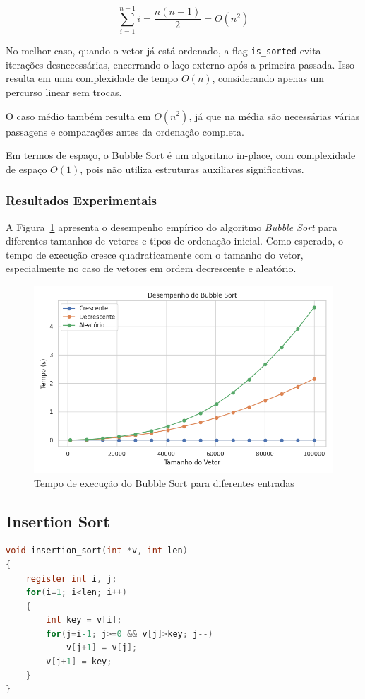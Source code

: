 \[
\sum_{i=1}^{n-1} i = \frac{n(n-1)}{2} = O(n^2)
\]

No melhor caso, quando o vetor já está ordenado, a flag \texttt{is\_sorted} evita iterações desnecessárias, encerrando o laço externo após a primeira passada. Isso resulta em uma complexidade de tempo \(O(n)\), considerando apenas um percurso linear sem trocas.

O caso médio também resulta em \(O(n^2)\), já que na média são necessárias várias passagens e comparações antes da ordenação completa.

Em termos de espaço, o Bubble Sort é um algoritmo in-place, com complexidade de espaço \(O(1)\), pois não utiliza
estruturas auxiliares significativas.~\cite{geeksforgeeks_bubble_sort}

\subsubsection{Resultados Experimentais}

A Figura~\ref{fig:bubble-grafico} apresenta o desempenho empírico do algoritmo \textit{Bubble Sort} para diferentes
tamanhos de vetores e tipos de ordenação inicial. Como esperado, o tempo de execução cresce quadraticamente com o
tamanho do vetor, especialmente no caso de vetores em ordem decrescente e aleatório.

\begin{figure}[H]
    \centering
    \includegraphics[width=1\textwidth]{../codigos/resultados/bubble_grafico.png}
    \caption{Tempo de execução do Bubble Sort para diferentes entradas}
    \label{fig:bubble-grafico}
\end{figure}

\subsection{Insertion Sort}
\begin{lstlisting}[language=C, caption={Implementação do Insertion Sort}, label={lst:insertion}]
void insertion_sort(int *v, int len)
{
    register int i, j;
    for(i=1; i<len; i++)
    {
        int key = v[i];
        for(j=i-1; j>=0 && v[j]>key; j--)
            v[j+1] = v[j];
        v[j+1] = key;
    }
}
\end{lstlisting}


